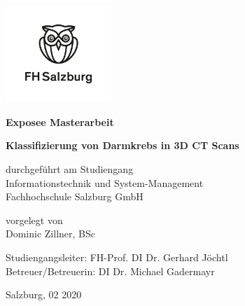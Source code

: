 \begin{titlepage}
\begin{center}

\includegraphics[width=4cm]{images/FHS_logo.jpg}

\vspace*{1cm}

\Large{
	\textbf{Exposee Masterarbeit}
}
\vspace*{1cm}

\large{
	\textbf{Klassifizierung von Darmkrebs in 3D CT Scans}
}

\vspace*{2cm}

\large{
    durchgeführt am Studiengang
    \\Informationstechnik und System-Management
    \\Fachhochschule Salzburg GmbH
}

\vspace*{2cm}
\large{
    vorgelegt von
    \\Dominic Zillner, BSc
}

\end{center}

\vspace*{2cm}

\begin{center}

\large{
    Studiengangsleiter: FH-Prof. DI Dr. Gerhard Jöchtl
    \\Betreuer/Betreuerin: DI Dr. Michael Gadermayr
}

\vspace{1cm}

\large{
    Salzburg, 02 2020
}
\end{center}
\end{titlepage}

